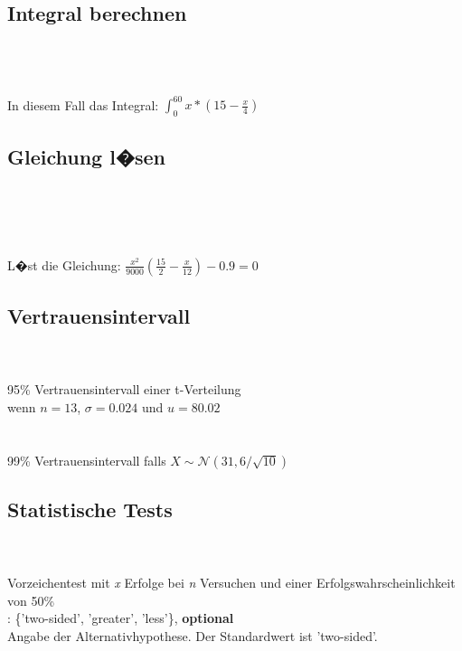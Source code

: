 \documentclass{article}
\begin{document}
\begin{multicols*}{3}
\subsection*{Integral berechnen}
 \\
 \\
 \\
In diesem Fall das Integral: $\int_{0}^{60} x * (15 - \frac{x}{4})$

\subsection*{Gleichung l�sen}
 \\
 \\
 \\
 \\
L�st die Gleichung: $\frac{x^2}{9000} (\frac{15}{2} - \frac{x}{12}) - 0.9 = 0$

\subsection*{Vertrauensintervall}
 \\
 \\
95\% Vertrauensintervall einer t-Verteilung \\
wenn $n=13$, $\sigma=0.024$ und $u=80.02$ \\

 \\
 \\
99\% Vertrauensintervall falls $X \sim \mathcal{N}(31, 6 / \sqrt{10})$

\vfill\null
\columnbreak

\subsection*{Statistische Tests}
 \\
\\
Vorzeichentest mit \textit{x} Erfolge bei \textit{n} Versuchen
und einer Erfolgswahrscheinlichkeit von 50\%
\vspace{0.5em}\\
 : \{'two-sided', 'greater', 'less'\}, \textbf{optional}\\
Angabe der Alternativhypothese. Der Standardwert ist 'two-sided'.\\


\end{multicols*}
\end{document}
